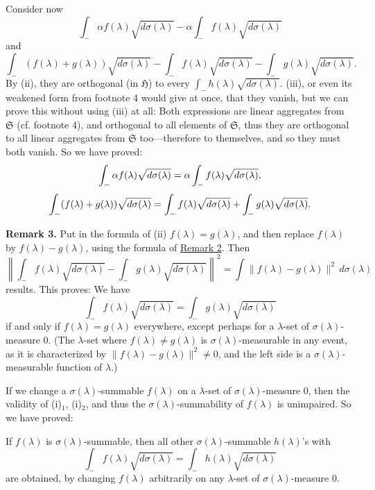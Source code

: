 \documentclass[b5paper,12pt,twoside]{article}
\numberwithin{equation}{section}
\theoremstyle{vnplain}
\theoremstyle{vndefinition}
\begin{document}
Consider now
\[
\int_{-}\alpha f(\lambda)\sqrt{d\sigma(\lambda)}
 -\alpha\int_{-}f(\lambda)\sqrt{d\sigma(\lambda)}
\]
and
\[
\int_{-}(f(\lambda)+g(\lambda))\sqrt{d\sigma(\lambda)}
 -\int_{-}f(\lambda)\sqrt{d\sigma(\lambda)}
 -\int_{-}g(\lambda)\sqrt{d\sigma(\lambda)}.
\]
By (ii), they are orthogonal (in $\mathfrak H$) to every
$\int_{-}h(\lambda)\sqrt{d\sigma(\lambda)}$. (iii), or even its weakened form
from footnote 4 would give at once, that they vanish, but we can prove this
without using (iii) at all: Both expressions are linear aggregates from
$\mathfrak S$ (cf. footnote 4), and orthogonal to all elements of
$\mathfrak S$, thus they are orthogonal to all linear aggregates from
$\mathfrak S$ too---therefore to themselves, and so they must both vanish. So
we have proved:
\begin{gather*}
\int_{-}\alpha f(\lambda)\sqrt{d\sigma(\lambda)}
 =\alpha\int_{-}f(\lambda)\sqrt{d\sigma(\lambda)},\\[0.18\baselineskip]
\int_{-}(f(\lambda)+g(\lambda))\sqrt{d\sigma(\lambda)}
 =\int_{-}f(\lambda)\sqrt{d\sigma(\lambda)}
  +\int_{-}g(\lambda)\sqrt{d\sigma(\lambda)}.
\end{gather*}

\medskip\noindent{}\label{rem:3.3}\textbf{Remark 3.}
Put in the formula of (ii) $f(\lambda)=g(\lambda)$, and then replace
$f(\lambda)$ by $f(\lambda)-g(\lambda)$, using the formula of
\hyperref[rem:3.2]{Remark 2}. Then
\[
\left\lVert
 \int_{-}f(\lambda)\sqrt{d\sigma(\lambda)}
 -\int_{-}g(\lambda)\sqrt{d\sigma(\lambda)}
\right\rVert^2
=\int\lVert f(\lambda)-g(\lambda)\rVert^2\,d\sigma(\lambda)
\]
results.
This proves: We have
\[
\int_{-}f(\lambda)\sqrt{d\sigma(\lambda)}
=\int_{-}g(\lambda)\sqrt{d\sigma(\lambda)}
\]
if and only if $f(\lambda)=g(\lambda)$ everywhere, except perhaps for a
$\lambda$-set of $\sigma(\lambda)$-measure 0. (The $\lambda$-set where
$f(\lambda)\ne g(\lambda)$ is $\sigma(\lambda)$-measurable in any event, as it
is characterized by $\lVert f(\lambda)-g(\lambda)\rVert^2\ne0$, and the left
side is a $\sigma(\lambda)$-measurable function of $\lambda$.)

If we change a $\sigma(\lambda)$-summable $f(\lambda)$ on a $\lambda$-set of
$\sigma(\lambda)$-measure 0, then the validity of (i)$_1$, (i)$_2$, and thus
the $\sigma(\lambda)$-summability of $f(\lambda)$ is unimpaired. So we have
proved:

If $f(\lambda)$ is $\sigma(\lambda)$-summable, then all other
$\sigma(\lambda)$-summable $h(\lambda)$'s with
\[
\int_{-}f(\lambda)\sqrt{d\sigma(\lambda)}
=\int_{-}h(\lambda)\sqrt{d\sigma(\lambda)}
\]
are obtained, by changing $f(\lambda)$ arbitrarily on any $\lambda$-set of
$\sigma(\lambda)$-measure 0.
\end{document}
